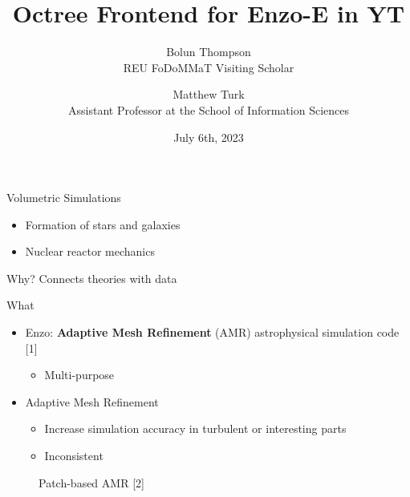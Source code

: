 \documentclass[
  ignorenonframetext,
]{beamer}
\title{Octree Frontend for Enzo-E in YT}
\author{Bolun Thompson\\
REU FoDoMMaT Visiting Scholar\\ \and Matthew Turk\\
Assistant Professor at the School of Information Sciences\\}
\date{July 6th, 2023}
\providecommand{\tightlist}{%
  \setlength{\itemsep}{0pt}\setlength{\parskip}{0pt}}
\begin{document}
\frame{\titlepage}

\begin{frame}{Volumetric Simulations}
\protect\hypertarget{volumetric-simulations}{}
\begin{itemize}
\tightlist
\item
  Formation of stars and galaxies
\item
  Nuclear reactor mechanics
\end{itemize}
\end{frame}

\begin{frame}{Why?}
\protect\hypertarget{why}{}
Connects theories with data
\end{frame}

\begin{frame}{What}
\protect\hypertarget{what}{}
\begin{itemize}
\tightlist
\item
  Enzo: \textbf{Adaptive Mesh Refinement} (AMR) astrophysical simulation
  code {[}1{]}

  \begin{itemize}
  \tightlist
  \item
    Multi-purpose
  \end{itemize}
\item
  Adaptive Mesh Refinement

  \begin{itemize}
  \tightlist
  \item
    Increase simulation accuracy in turbulent or interesting parts
  \item
    Inconsistent
  \end{itemize}
\end{itemize}

\begin{figure}
\centering

\caption{Patch-based AMR {[}2{]}}
\end{figure}
\end{frame}
\end{document}
